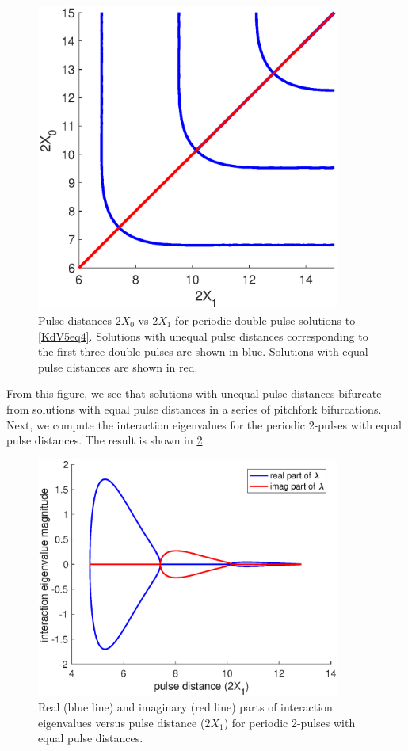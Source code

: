 \documentclass[thesis.tex]{subfiles}
\begin{document}
\begin{figure}
\includegraphics[width=10cm]{images/kdv5numerics/periodicpitchfork.eps}
\caption{Pulse distances $2 X_0$ vs $2 X_1$ for periodic double pulse solutions to \cref{KdV5eq4}. Solutions with unequal pulse distances corresponding to the first three double pulses are shown in blue. Solutions with equal pulse distances are shown in red.}
\label{fig:periodicpitchfork}
\end{figure}

From this figure, we see that solutions with unequal pulse distances bifurcate from solutions with equal pulse distances in a series of pitchfork bifurcations. Next, we compute the interaction eigenvalues for the periodic 2-pulses with equal pulse distances. The result is shown in \cref{fig:periodicequaleigbif}.

\begin{figure}
\includegraphics[width=10cm]{images/kdv5numerics/periodicequaleigbif.eps}
\caption{Real (blue line) and imaginary (red line) parts of interaction eigenvalues versus pulse distance ($2 X_1$) for periodic 2-pulses with equal pulse distances.}
\label{fig:periodicequaleigbif}
\end{figure}
\end{document}
